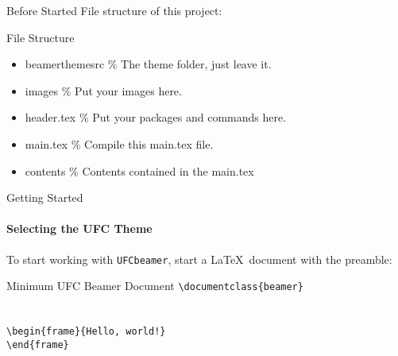 \begin{frame}{Before Started}
File structure of this project:
\begin{block}{File Structure}
    \begin{itemize}
        \item beamerthemesrc \hspace{2pt} \% The theme folder, just leave it.
        \item images \hspace{2pt} \% Put your images here.
        \item header.tex \hspace{2pt} \% Put your packages and commands here.
        \item main.tex \hspace{2pt} \% Compile this main.tex file.
        \item contents \hspace{2pt} \% Contents contained in the main.tex
    \end{itemize}
\end{block}
\end{frame}

\begin{frame}[fragile]{Getting Started}
\framesubtitle{Selecting the UFC Theme}
To start working with \texttt{UFCbeamer}, start a \LaTeX\ document with the
preamble:
\begin{block}{Minimum UFC Beamer Document}
\verb|\documentclass{beamer}|\\
\verb||\\
\verb||\\
\verb|\begin{frame}{Hello, world!}|\\
\verb|\end{frame}|\\
\verb||\\
\end{block}
\end{frame}

